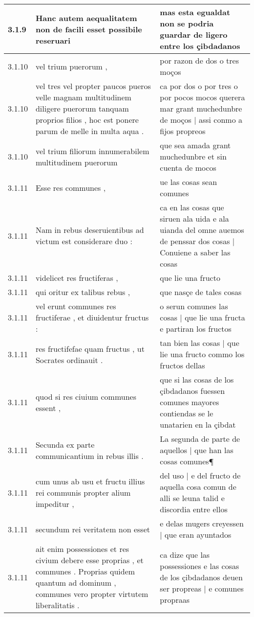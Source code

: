 \begin{tabular}{|p{1cm}|p{6.5cm}|p{6.5cm}|}
3.1.9 & Hanc autem aequalitatem non de facili esset possibile reseruari & mas esta egualdat non se podria guardar de ligero entre los çibdadanos \\\hline
3.1.10 & vel trium puerorum , & por razon de dos o tres moços \\\hline
3.1.10 & vel tres vel propter paucos pueros velle magnam multitudinem diligere puerorum tanquam proprios filios , hoc est ponere parum de melle in multa aqua . & ca por dos o por tres o por pocos mocos querera mar grant muchedunbre de moços | assi conmo a fijos propreos \\\hline
3.1.10 & vel trium filiorum innumerabilem multitudinem puerorum & que sea amada grant muchedunbre et sin cuenta de mocos \\\hline
3.1.11 & Esse res communes , & ue las cosas sean comunes \\\hline
3.1.11 & Nam in rebus deseruientibus ad victum est considerare duo : & ca en las cosas que siruen ala uida e ala uianda del omne auemos de penssar dos cosas | Conuiene a saber las cosas \\\hline
3.1.11 & videlicet res fructiferas , & que lie una fructo \\\hline
3.1.11 & qui oritur ex talibus rebus , & que nasçe de tales cosas \\\hline
3.1.11 & vel erunt communes res fructiferae , et diuidentur fructus : & o serun comunes las cosas | que lie una fructa e partiran los fructos \\\hline
3.1.11 & res fructifefae quam fructus , ut Socrates ordinauit . & tan bien las cosas | que lie una fructo commo los fructos dellas \\\hline
3.1.11 & quod si res ciuium communes essent , & que si las cosas de los çibdadanos fuessen comunes mayores contiendas se le unatarien en la çibdat \\\hline
3.1.11 & Secunda ex parte communicantium in rebus illis . & La segunda de parte de aquellos | que han las cosas comunes¶ \\\hline
3.1.11 & cum unus ab usu et fructu illius rei communis propter alium impeditur , & del uso | e del fructo de aquella cosa comun de alli se leuna talid e discordia entre ellos \\\hline
3.1.11 & secundum rei veritatem non esset & e delas mugers creyessen | que eran ayuntados \\\hline
3.1.11 & ait enim possessiones et res civium debere esse proprias , et communes . Proprias quidem quantum ad dominum , communes vero propter virtutem liberalitatis . & ca dize que las possessiones e las cosas de los çibdadanos deuen ser propreas | e comunes propraas \\\hline

\end{tabular}
